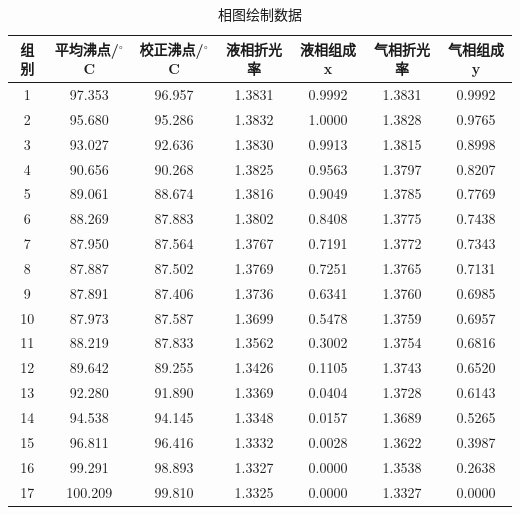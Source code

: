 \documentclass[12pt]{ctexart}
\numberwithin{equation}{section}
\begin{document}
\begin{longtable}{ccccccc}
    \caption{相图绘制数据} \\
    \hline
    组别 & 平均沸点/$^\circ$C & 校正沸点/$^\circ$C & 液相折光率 & 液相组成x & 气相折光率 & 气相组成y \\
    \hline
     1 &  97.353 & 96.957 & 1.3831 & 0.9992 & 1.3831 & 0.9992 \\
     2 &  95.680 & 95.286 & 1.3832 & 1.0000 & 1.3828 & 0.9765 \\
     3 &  93.027 & 92.636 & 1.3830 & 0.9913 & 1.3815 & 0.8998 \\
     4 &  90.656 & 90.268 & 1.3825 & 0.9563 & 1.3797 & 0.8207 \\
     5 &  89.061 & 88.674 & 1.3816 & 0.9049 & 1.3785 & 0.7769 \\
     6 &  88.269 & 87.883 & 1.3802 & 0.8408 & 1.3775 & 0.7438 \\
     7 &  87.950 & 87.564 & 1.3767 & 0.7191 & 1.3772 & 0.7343 \\
     8 &  87.887 & 87.502 & 1.3769 & 0.7251 & 1.3765 & 0.7131 \\
     9 &  87.891 & 87.406 & 1.3736 & 0.6341 & 1.3760 & 0.6985 \\
    10 &  87.973 & 87.587 & 1.3699 & 0.5478 & 1.3759 & 0.6957 \\
    11 &  88.219 & 87.833 & 1.3562 & 0.3002 & 1.3754 & 0.6816 \\
    12 &  89.642 & 89.255 & 1.3426 & 0.1105 & 1.3743 & 0.6520 \\
    13 &  92.280 & 91.890 & 1.3369 & 0.0404 & 1.3728 & 0.6143 \\
    14 &  94.538 & 94.145 & 1.3348 & 0.0157 & 1.3689 & 0.5265 \\
    15 &  96.811 & 96.416 & 1.3332 & 0.0028 & 1.3622 & 0.3987 \\
    16 &  99.291 & 98.893 & 1.3327 & 0.0000 & 1.3538 & 0.2638 \\
    17 & 100.209 & 99.810 & 1.3325 & 0.0000 & 1.3327 & 0.0000 \\
    \hline
\end{longtable}
\end{document}
